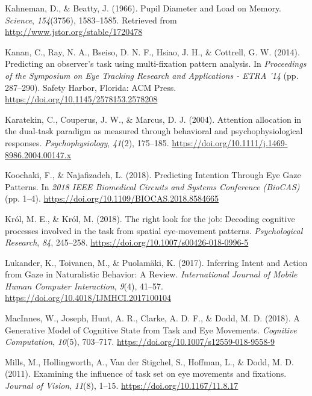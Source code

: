 \documentclass[
  english,
  man, donotrepeattitle,floatsintext]{apa6}
\begin{document}
\leavevmode\hypertarget{ref-kahnemanPupilDiameterLoad1966}{}%
Kahneman, D., \& Beatty, J. (1966). Pupil Diameter and Load on Memory. \emph{Science}, \emph{154}(3756), 1583--1585. Retrieved from \url{http://www.jstor.org/stable/1720478}

\leavevmode\hypertarget{ref-kananPredictingObserverTask2014a}{}%
Kanan, C., Ray, N. A., Bseiso, D. N. F., Hsiao, J. H., \& Cottrell, G. W. (2014). Predicting an observer's task using multi-fixation pattern analysis. In \emph{Proceedings of the Symposium on Eye Tracking Research and Applications - ETRA '14} (pp. 287--290). Safety Harbor, Florida: ACM Press. \url{https://doi.org/10.1145/2578153.2578208}

\leavevmode\hypertarget{ref-karatekinAttentionAllocationDualtask2004}{}%
Karatekin, C., Couperus, J. W., \& Marcus, D. J. (2004). Attention allocation in the dual-task paradigm as measured through behavioral and psychophysiological responses. \emph{Psychophysiology}, \emph{41}(2), 175--185. \url{https://doi.org/10.1111/j.1469-8986.2004.00147.x}

\leavevmode\hypertarget{ref-koochakiPredictingIntentionEye2018a}{}%
Koochaki, F., \& Najafizadeh, L. (2018). Predicting Intention Through Eye Gaze Patterns. In \emph{2018 IEEE Biomedical Circuits and Systems Conference (BioCAS)} (pp. 1--4). \url{https://doi.org/10.1109/BIOCAS.2018.8584665}

\leavevmode\hypertarget{ref-krolRightLookJob2018a}{}%
Król, M. E., \& Król, M. (2018). The right look for the job: Decoding cognitive processes involved in the task from spatial eye-movement patterns. \emph{Psychological Research}, \emph{84}, 245--258. \url{https://doi.org/10.1007/s00426-018-0996-5}

\leavevmode\hypertarget{ref-lukanderInferringIntentAction2017c}{}%
Lukander, K., Toivanen, M., \& Puolamäki, K. (2017). Inferring Intent and Action from Gaze in Naturalistic Behavior: A Review. \emph{International Journal of Mobile Human Computer Interaction}, \emph{9}(4), 41--57. \url{https://doi.org/10.4018/IJMHCI.2017100104}

\leavevmode\hypertarget{ref-macinnesjosephGenerativeModelCognitive2018a}{}%
MacInnes, W., Joseph, Hunt, A. R., Clarke, A. D. F., \& Dodd, M. D. (2018). A Generative Model of Cognitive State from Task and Eye Movements. \emph{Cognitive Computation}, \emph{10}(5), 703--717. \url{https://doi.org/10.1007/s12559-018-9558-9}

\leavevmode\hypertarget{ref-millsExaminingInfluenceTask2011a}{}%
Mills, M., Hollingworth, A., Van der Stigchel, S., Hoffman, L., \& Dodd, M. D. (2011). Examining the influence of task set on eye movements and fixations. \emph{Journal of Vision}, \emph{11}(8), 1--15. \url{https://doi.org/10.1167/11.8.17}
\end{document}
